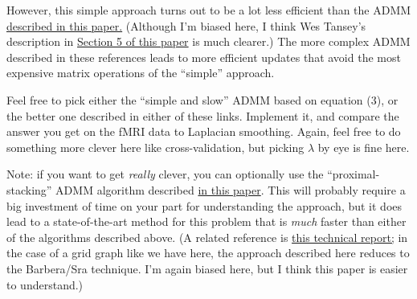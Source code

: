 \documentclass{mynotes}
\begin{document}
\begin{enumerate}[(A)]
However, this simple approach turns out to be a lot less efficient than the ADMM \href{https://arxiv.org/abs/1203.1828}{described in this paper.}  (Although I'm biased here, I think Wes Tansey's description in \href{https://arxiv.org/abs/1411.6144}{Section 5 of this paper} is much clearer.)  The more complex ADMM described in these references leads to more efficient updates that avoid the most expensive matrix operations of the ``simple'' approach.

Feel free to pick either the ``simple and slow'' ADMM based on equation (3), or the better one described in either of these links.  Implement it, and compare the answer you get on the fMRI data to Laplacian smoothing.  Again, feel free to do something more clever here like cross-validation, but picking $\lambda$ by eye is fine here.

Note: if you want to get \textit{really} clever, you can optionally use the ``proximal-stacking'' ADMM algorithm described \href{https://arxiv.org/abs/1411.0589}{in this paper}.  This will probably require a big investment of time on your part for understanding the approach, but it does lead to a state-of-the-art method for this problem that is \textit{much} faster than either of the algorithms described above.  (A related reference is \href{https://arxiv.org/abs/1505.06475}{this technical report;} in the case of a grid graph like we have here, the approach described here reduces to the Barbera/Sra technique.  I'm again biased here, but I think this paper is easier to understand.)

\end{enumerate}
\end{document}
